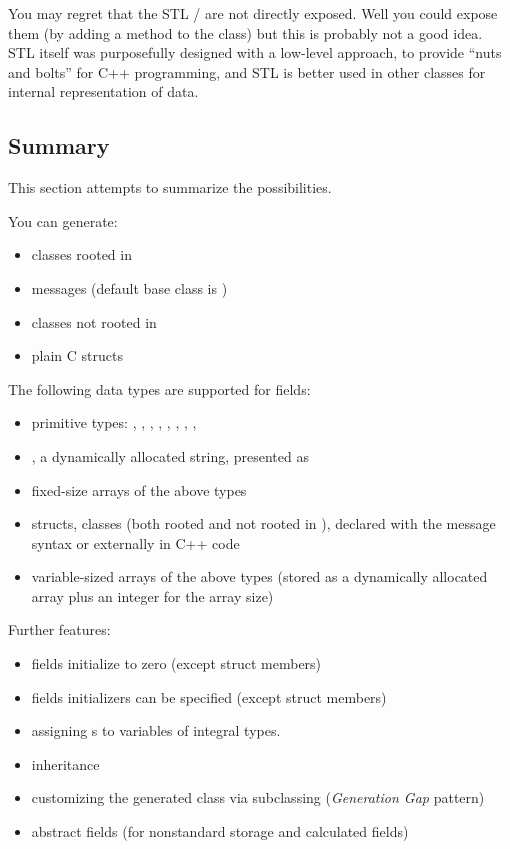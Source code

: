 You may regret that the STL / are not directly exposed.
Well you could expose them (by adding a 
method to the class) but this is probably not a good idea.
STL itself was purposefully designed with a low-level approach, to provide
``nuts and bolts'' for C++ programming, and STL is better used in other classes
for internal representation of data.



\subsection{Summary}

This section attempts to summarize the possibilities.

You can generate:

\begin{itemize}
  \item  classes rooted in 
  \item  messages (default base class is )
  \item  classes not rooted in 
  \item  plain C structs
\end{itemize}

The following data types are supported for fields:

\begin{itemize}
  \item  primitive types: , , ,
    , , , ,
    , 
  \item  {}, a dynamically allocated string, presented as 
  \item  fixed-size arrays of the above types
  \item  structs, classes (both rooted and not rooted in ),
    declared with the message syntax or externally in C++ code
  \item  variable-sized arrays of the above types (stored as a dynamically
    allocated array plus an integer for the array size)
\end{itemize}

Further features:

\begin{itemize}
  \item  fields initialize to zero (except struct members)
  \item  fields initializers can be specified (except struct members)
  \item  assigning s to variables of integral types.
  \item  inheritance
  \item  customizing the generated class via subclassing (\textit{Generation Gap} pattern)
  \item  abstract fields (for nonstandard storage and calculated fields)
\end{itemize}

